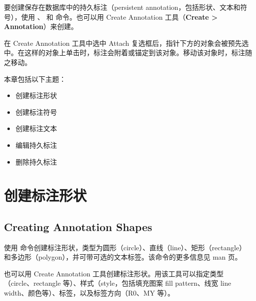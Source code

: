 \label{chap:gui-anno}

要创建保存在数据库中的持久标注（persistent annotation，包括形状、文本和符号），使用 、 和  命令。也可以用 Create Annotation 工具（\textbf{Create > Annotation}）来创建。

在 Create Annotation 工具中选中 Attach 复选框后，指针下方的对象会被预先选中。在这样的对象上单击时，标注会附着或锚定到该对象。移动该对象时，标注随之移动。

本章包括以下主题：
\begin{itemize}
  \item 创建标注形状
  \item 创建标注符号
  \item 创建标注文本
  \item 编辑持久标注
  \item 删除持久标注
\end{itemize}

\section{创建标注形状}
\subsection*{Creating Annotation Shapes}

使用  命令创建标注形状，类型为圆形（circle）、直线（line）、矩形（rectangle）和多边形（polygon），并可带可选的文本标签。该命令的更多信息见 man 页。

也可以用 Create Annotation 工具创建标注形状。用该工具可以指定类型（circle、rectangle 等）、样式（style，包括填充图案 fill pattern、线宽 line width、颜色等）、标签，以及标签方向（R0、MY 等）。

